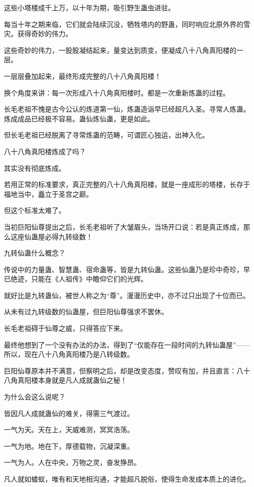 \begin{this_body}
这些小塔楼成千上万，以十年为期，吸引野生蛊虫进驻。

每当十年之期来临，它们就会陆续沉没，牺牲塔内的野蛊，同时响应北原外界的雪灾。获得奇妙的伟力。

这些奇妙的伟力，一股股凝结起来，量变达到质变，便凝成八十八角真阳楼的一层。

一层层叠加起来，最终形成完整的八十八角真阳楼！

换个角度来讲：每一次形成八十八角真阳楼时。都是一次重新炼蛊的过程。

长毛老祖不愧是古今公认的炼道第一仙，炼蛊造诣早已经超凡入圣。寻常人炼蛊。炼成成品已经极不容易。蛊仙炼仙蛊，更是如此。

但长毛老祖已经脱离了寻常炼蛊的范畴，可谓匠心独运，出神入化。

八十八角真阳楼炼成了吗？

其实没有彻底炼成。

若用正常的标准要求，真正完整的八十八角真阳楼，就是一座成形的塔楼，长存于福地当中，矗立于圣宫之巅。

但这个标准太难了。

当初巨阳仙尊提出之后，长毛老祖听了大皱眉头，当场开口说：若是真正炼成，那么这座仙蛊屋必得九转级数！

九转仙蛊什么概念？

传说中的力量蛊、智慧蛊、宿命蛊等，皆是九转仙蛊。这些仙蛊乃是珍中奇珍，早已绝迹，只能在《人祖传》中瞻仰它们的光辉。

就好比是九转蛊仙，被世人称之为“尊”。漫漫历史中，亦不过只出现了十位而已。

从未有过九转级数的仙蛊屋，但巨阳仙尊强求不罢休。

长毛老祖碍于仙尊之威，只得答应下来。

最终他想到了一个没有办法的办法，得到了“仅能存在一段时间的九转仙蛊屋”——所以，现在八十八角真阳楼乃是八转级数。

巨阳仙尊原本并不满意，但察明之后，却是改变态度，赞叹有加，并且直言：八十八角真阳楼本身就是凡人成就蛊仙之秘！

为什么会这么说呢？

皆因凡人成就蛊仙的难关，得需三气渡过。

一气为天。天在上，天威难测，冥冥浩荡。

一气为地。地在下，厚德载物，沉凝深重。

一气为人。人在中央，万物之灵，奋发狰昂。

凡人就如蝼蚁，唯有和天地相沟通，才能超凡脱俗，使得生命发成本质上的进化。


\end{this_body}
